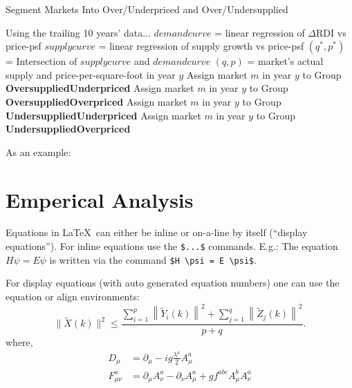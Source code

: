 \documentclass[sn-mathphys-num]{sn-jnl}%
\theoremstyle{thmstyleone}%
\theoremstyle{thmstyletwo}%
\theoremstyle{thmstylethree}%
\begin{document}
\begin{algorithm}
	\caption{Segment Markets Into Over/Underpriced and Over/Undersupplied}\label{alg:market_segmentation}
	\begin{algorithmic}[1]
		        \State Using the trailing 10 years' data...
		        \State $demandcurve$ = linear regression of  $\Delta\text{RDI}$  vs price-psf
		        \State $supplycurve$ = linear regression of supply growth vs price-psf
		        \State $(q^*, p^*)$ = Intersection of $supplycurve$ and $demandcurve$
		        \State $(q, p)$ = market's actual supply and price-per-square-foot in year $y$
		                \State Assign market $m$ in year $y$ to Group \textbf{OversuppliedUnderpriced}
		            \Else
		                \State Assign market $m$ in year $y$ to Group \textbf{OversuppliedOverpriced}
		            \EndIf
		        \Else
		                \State Assign market $m$ in year $y$ to Group \textbf{UndersuppliedUnderpriced}
		            \Else
		                \State Assign market $m$ in year $y$ to Group \textbf{UndersuppliedOverpriced}
		            \EndIf
		        \EndIf
		    \EndFor
		\EndFor
	\end{algorithmic}
\end{algorithm}


As an example:





\section{Emperical Analysis}



Equations in \LaTeX\ can either be inline or on-a-line by itself (``display equations''). For
inline equations use the \verb+$...$+ commands. E.g.: The equation
$H\psi = E \psi$ is written via the command \verb+$H \psi = E \psi$+.

For display equations (with auto generated equation numbers)
one can use the equation or align environments:
\begin{equation}
    \|\tilde{X}(k)\|^2 \leq\frac{\sum\limits_{i=1}^{p}\left\|\tilde{Y}_i(k)\right\|^2+\sum\limits_{j=1}^{q}\left\|\tilde{Z}_j(k)\right\|^2 }{p+q}.\label{eq1}
\end{equation}
where,
\begin{align}
    D_\mu        & =  \partial_\mu - ig \frac{\lambda^a}{2} A^a_\mu \nonumber                            \\
    F^a_{\mu\nu} & = \partial_\mu A^a_\nu - \partial_\nu A^a_\mu + g f^{abc} A^b_\mu A^a_\nu \label{eq2}
\end{align}
\end{document}
